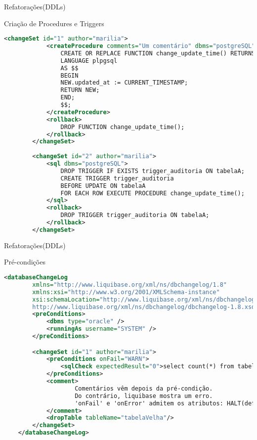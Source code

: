 \begin{frame}[fragile]{Refatorações(DDLs)}
\begin{block}{Criação de Procedures e Triggers}
    \begin{lstlisting}[language=XML]
        <changeSet id="1" author="marilia">
            <createProcedure comments="Um comentário" dbms="postgreSQL">
                CREATE OR REPLACE FUNCTION change_update_time() RETURNS trigger
                LANGUAGE plpgsql
                AS $$
                BEGIN
                NEW.updated_at := CURRENT_TIMESTAMP;
                RETURN NEW;
                END;
                $$;
            </createProcedure>
            <rollback>
                DROP FUNCTION change_update_time();
            </rollback>
        </changeSet>
        
        <changeSet id="2" author="marilia">
            <sql dbms="postgreSQL">
                DROP TRIGGER IF EXISTS trigger_auditoria ON tabelaA;
                CREATE TRIGGER trigger_auditoria 
                BEFORE UPDATE ON tabelaA 
                FOR EACH ROW EXECUTE PROCEDURE change_update_time();
            </sql>
            <rollback>
                DROP TRIGGER trigger_auditoria ON tabelaA;
            </rollback>
        </changeSet>
    \end{lstlisting}
\end{block}
\end{frame}

\begin{frame}[fragile]{Refatorações(DDLs)}

\begin{block}{Pré-condições}
    \begin{lstlisting}[language=XML]
    <databaseChangeLog
        xmlns="http://www.liquibase.org/xml/ns/dbchangelog/1.8"
        xmlns:xsi="http://www.w3.org/2001/XMLSchema-instance"
        xsi:schemaLocation="http://www.liquibase.org/xml/ns/dbchangelog/1.8
        http://www.liquibase.org/xml/ns/dbchangelog/dbchangelog-1.8.xsd">
        <preConditions>
            <dbms type="oracle" />
            <runningAs username="SYSTEM" />
        </preConditions>

        <changeSet id="1" author="marilia">
            <preConditions onFail="WARN">
                <sqlCheck expectedResult="0">select count(*) from tabelaVelha</sqlCheck>
            </preConditions>
            <comment>
                    Comentários vêm depois da pré-condição.  
                    Do contrário, liquibase mostra um erro.
                    'onFail' e 'onError' admitem os atributos: HALT(default), CONTINUE, MARK_RUN e WARN
            </comment>
            <dropTable tableName="tabelaVelha"/>
        </changeSet>
    </databaseChangeLog>
    \end{lstlisting}
\end{block}
\end{frame}


